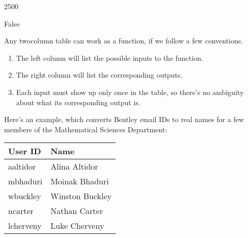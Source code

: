 \documentclass[letterpaper,10pt,english]{sphinxmanual}
\begin{document}
\begin{sphinxVerbatim}[commandchars=\\\{\}]
2500
\end{sphinxVerbatim}

\begin{sphinxVerbatim}[commandchars=\\\{\}]
  
\end{sphinxVerbatim}

\begin{sphinxVerbatim}[commandchars=\\\{\}]
False
\end{sphinxVerbatim}

 Any two\sphinxhyphen{}column table can work as a function, if we follow a few conventions.
\begin{enumerate}
%
\item {} 
The left column will list the possible inputs to the function.

\item {} 
The right column will list the corresponding outputs.

\item {} 
Each input must show up only once in the table, so there’s no ambiguity about what its corresponding output is.

\end{enumerate}

Here’s an example, which converts Bentley email IDs to real names for a few members of the Mathematical Sciences Department:


\begin{savenotes}\sphinxattablestart
\centering
\begin{tabulary}{\linewidth}[t]{|T|T|}
\hline
\sphinxstyletheadfamily 
User ID
&\sphinxstyletheadfamily 
Name
\\
\hline
aaltidor
&
Alina Altidor
\\
\hline
mbhaduri
&
Moinak Bhaduri
\\
\hline
wbuckley
&
Winston Buckley
\\
\hline
ncarter
&
Nathan Carter
\\
\hline
lcherveny
&
Luke Cherveny
\\
\hline
\end{tabulary}
\par
\sphinxattableend\end{savenotes}
\end{document}

